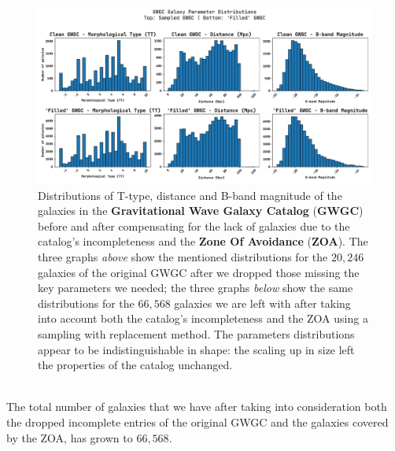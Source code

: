 \begin{figure}[h!]
    \begin{center}
        \includegraphics[width=\textwidth]{images/distro_comparison.pdf}
    \end{center}
    \caption{Distributions of T-type, distance and B-band magnitude of the galaxies in the \textbf{Gravitational Wave Galaxy Catalog} (\textbf{GWGC}) before and after compensating for the lack of galaxies due to the catalog's incompleteness and the \textbf{Zone Of Avoidance} (\textbf{ZOA}). 
    The three graphs \textit{above} show the mentioned distributions for the $20,246$ galaxies of the original GWGC after we dropped those missing the key parameters we needed; the three graphs \textit{below} show the same distributions for the $66,568$ galaxies we are left with after taking into account both the catalog's incompleteness and the ZOA using a sampling with replacement method.
    The parameters distributions appear to be indistinguishable in shape: the scaling up in size left the properties of the catalog unchanged.
    }\label{fig: distro comparison}
\end{figure}
\\
The total number of galaxies that we have after taking into consideration both the dropped incomplete entries of the original GWGC and the galaxies covered by the ZOA, has grown to $66,568$.


